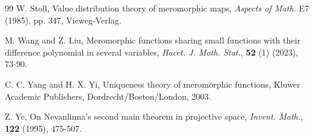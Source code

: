 \documentclass[11pt,reqno]{amsart}
\numberwithin{equation}{section}
\begin{document}
\begin{thebibliography}{99}
 {\sc W. Stoll}, Value distribution theory of meromorphic maps, \textit{Aspects of Math.} E7 (1985), pp. 347, Vieweg-Verlag.

 {\sc M. Wang} and {\sc Z. Liu}, Meromorphic functions sharing small functions with their difference polynomial in several variables, \textit{Hacet. J. Math. Stat.}, \textbf{52} (1) (2023), 73-90.

 {\sc C. C. Yang} and {\sc H. X. Yi}, Uniqueness theory of meromorphic functions, Kluwer Academic Publishers, Dordrecht/Boston/London, 2003.

 {\sc Z. Ye}, On Nevanlinna's second main theorem in projective space, \textit{Invent. Math.}, \textbf{122} (1995), 475-507.

\end{thebibliography}
\end{document}
